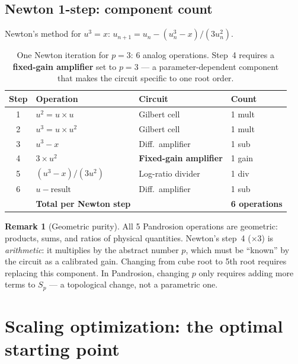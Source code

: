 \documentclass[11pt,a4paper]{article}
\theoremstyle{definition}
\newtheorem{remark}{Remark}[section]
\begin{document}
\subsection{Newton 1-step: component count}

Newton's method for $u^3 = x$: $u_{n+1} = u_n - (u_n^3 - x)/(3u_n^2)$.

\begin{table}[H]
\centering
\renewcommand{\arraystretch}{1.3}
\begin{tabular}{clll}
\toprule
\textbf{Step} & \textbf{Operation} & \textbf{Circuit} & \textbf{Count} \\
\midrule
1 & $u^2 = u \times u$ & Gilbert cell & 1 mult \\
2 & $u^3 = u \times u^2$ & Gilbert cell & 1 mult \\
3 & $u^3 - x$ & Diff.\ amplifier & 1 sub \\
4 & $3 \times u^2$ & \textbf{Fixed-gain amplifier} & 1 gain \\
5 & $(u^3 - x) / (3u^2)$ & Log-ratio divider & 1 div \\
6 & $u - \text{result}$ & Diff.\ amplifier & 1 sub \\
\midrule
  & \textbf{Total per Newton step} & & \textbf{6 operations} \\
\bottomrule
\end{tabular}
\caption{One Newton iteration for $p=3$: 6 analog operations.  Step~4 requires a \textbf{fixed-gain amplifier} set to $p = 3$ --- a parameter-dependent component that makes the circuit specific to one root order.}
\label{tab:newton_ops}
\end{table}

\begin{remark}[Geometric purity]
All 5 Pandrosion operations are geometric: products, sums, and ratios of physical quantities.  Newton's step~4 ($\times 3$) is \emph{arithmetic}: it multiplies by the abstract number $p$, which must be ``known'' by the circuit as a calibrated gain.  Changing from cube root to 5th root requires replacing this component.  In Pandrosion, changing $p$ only requires adding more terms to $S_p$ --- a topological change, not a parametric one.
\end{remark}

\section{Scaling optimization: the optimal starting point}
\label{sec:scaling}
\end{document}
